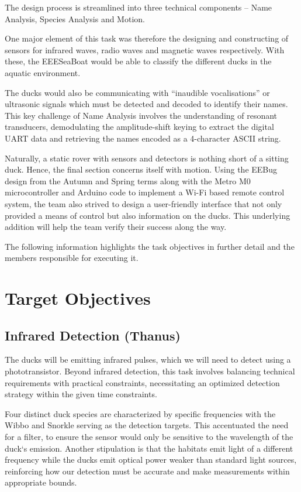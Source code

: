 The design process is streamlined into three technical components – Name Analysis, Species Analysis and Motion.

One major element of this task was therefore the designing and constructing of sensors for infrared waves, radio waves and magnetic waves respectively. With these, the EEESeaBoat would be able to classify the different ducks in the aquatic environment.

The ducks would also be communicating with “inaudible vocalisations” or ultrasonic signals which must be detected and decoded to identify their names. This key challenge of Name Analysis involves the understanding of resonant transducers, demodulating the amplitude-shift keying to extract the digital UART data and retrieving the names encoded as a 4-character ASCII string.

Naturally, a static rover with sensors and detectors is nothing short of a sitting duck. Hence, the final section concerns itself with motion. Using the EEBug design from the Autumn and Spring terms along with the Metro M0 microcontroller and Arduino code to implement a Wi-Fi based remote control system, the team also strived to design a user-friendly interface that not only provided a means of control but also information on the ducks. This underlying addition will help the team verify their success along the way.

The following information highlights the task objectives in further detail and the members responsible for executing it.

\section*{Target Objectives}

\subsection*{Infrared Detection (Thanus)}

The ducks will be emitting infrared pulses, which we will need to detect using a phototransistor. Beyond infrared detection, this task involves balancing technical requirements with practical constraints, necessitating an optimized detection strategy within the given time constraints.

Four distinct duck species are characterized by specific frequencies with the Wibbo and Snorkle serving as the detection targets. This accentuated the need for a filter, to ensure the sensor would only be sensitive to the wavelength of the duck`s emission. Another stipulation is that the habitats emit light of a different frequency while the ducks emit optical power weaker than standard light sources, reinforcing how our detection must be accurate and make measurements within appropriate bounds.

